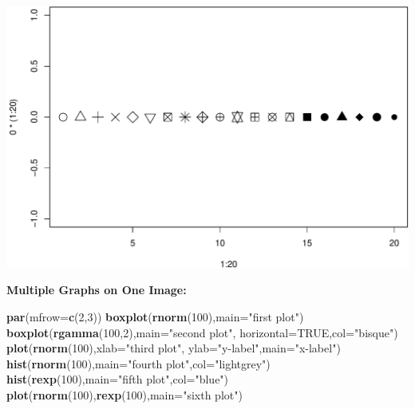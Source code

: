 \documentclass[]{article}
\newenvironment{Shaded}{\begin{snugshade}}{\end{snugshade}}
\newcommand{\KeywordTok}[1]{\textcolor[rgb]{0.13,0.29,0.53}{\textbf{{#1}}}}
\newcommand{\DataTypeTok}[1]{\textcolor[rgb]{0.13,0.29,0.53}{{#1}}}
\newcommand{\DecValTok}[1]{\textcolor[rgb]{0.00,0.00,0.81}{{#1}}}
\newcommand{\StringTok}[1]{\textcolor[rgb]{0.31,0.60,0.02}{{#1}}}
\newcommand{\OtherTok}[1]{\textcolor[rgb]{0.56,0.35,0.01}{{#1}}}
\newcommand{\NormalTok}[1]{{#1}}
\numberwithin{equation}{section}
\begin{document}
\includegraphics{index_files/figure-latex/unnamed-chunk-81-1.pdf}

\textbf{Multiple Graphs on One Image:}

\begin{Shaded}
\begin{Highlighting}[]
 \KeywordTok{par}\NormalTok{(}\DataTypeTok{mfrow=}\KeywordTok{c}\NormalTok{(}\DecValTok{2}\NormalTok{,}\DecValTok{3}\NormalTok{))}
 \KeywordTok{boxplot}\NormalTok{(}\KeywordTok{rnorm}\NormalTok{(}\DecValTok{100}\NormalTok{),}\DataTypeTok{main=}\StringTok{"first plot"}\NormalTok{)}
 \KeywordTok{boxplot}\NormalTok{(}\KeywordTok{rgamma}\NormalTok{(}\DecValTok{100}\NormalTok{,}\DecValTok{2}\NormalTok{),}\DataTypeTok{main=}\StringTok{"second plot"}\NormalTok{, }\DataTypeTok{horizontal=}\OtherTok{TRUE}\NormalTok{,}\DataTypeTok{col=}\StringTok{"bisque"}\NormalTok{)}
 \KeywordTok{plot}\NormalTok{(}\KeywordTok{rnorm}\NormalTok{(}\DecValTok{100}\NormalTok{),}\DataTypeTok{xlab=}\StringTok{"third plot"}\NormalTok{,}
      \DataTypeTok{ylab=}\StringTok{"y-label"}\NormalTok{,}\DataTypeTok{main=}\StringTok{"x-label"}\NormalTok{)}
 \KeywordTok{hist}\NormalTok{(}\KeywordTok{rnorm}\NormalTok{(}\DecValTok{100}\NormalTok{),}\DataTypeTok{main=}\StringTok{"fourth plot"}\NormalTok{,}\DataTypeTok{col=}\StringTok{"lightgrey"}\NormalTok{)}
 \KeywordTok{hist}\NormalTok{(}\KeywordTok{rexp}\NormalTok{(}\DecValTok{100}\NormalTok{),}\DataTypeTok{main=}\StringTok{"fifth plot"}\NormalTok{,}\DataTypeTok{col=}\StringTok{"blue"}\NormalTok{)}
 \KeywordTok{plot}\NormalTok{(}\KeywordTok{rnorm}\NormalTok{(}\DecValTok{100}\NormalTok{),}\KeywordTok{rexp}\NormalTok{(}\DecValTok{100}\NormalTok{),}\DataTypeTok{main=}\StringTok{"sixth plot"}\NormalTok{)}
\end{Highlighting}
\end{Shaded}
\end{document}
